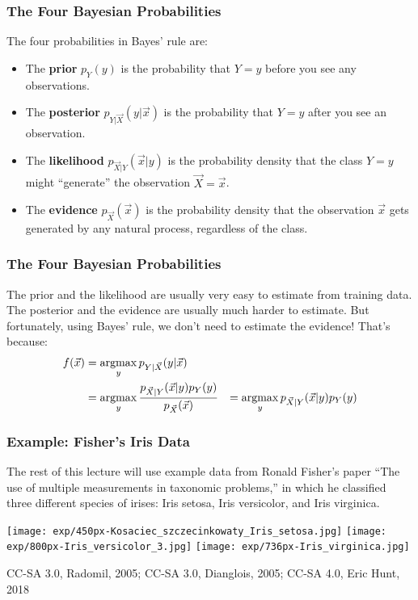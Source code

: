 \documentclass{beamer}
\newcommand{\argmax}{\operatornamewithlimits{argmax}}
\begin{document}
\begin{frame}
  \frametitle{The Four Bayesian Probabilities}

  The four probabilities in Bayes' rule are:
  \begin{itemize}
  \item
    The {\bf prior} $p_Y(y)$ is the probability that $Y=y$ before you
    see any observations.
  \item
    The {\bf posterior} $p_{Y|\vec{X}}(y|\vec{x})$ is the probability
    that $Y=y$ after you see an observation.
  \item
    The {\bf likelihood} $p_{\vec{X}|Y}(\vec{x}|y)$ is the probability
    density that the class $Y=y$ might ``generate'' the observation
    $\vec{X}=\vec{x}$.  
  \item
    The {\bf evidence} $p_{\vec{X}}(\vec{x})$ is the probability
    density that the observation $\vec{x}$ gets generated by any
    natural process, regardless of the class.
  \end{itemize}
\end{frame}

\begin{frame}
  \frametitle{The Four Bayesian Probabilities}

  The prior and the likelihood are usually very easy to estimate from
  training data.  The posterior and the evidence are usually much
  harder to estimate.  But fortunately, using Bayes' rule, we don't
  need to estimate the evidence!  That's because:
  \begin{align*}
    f(\vec{x}) &= \argmax_y p_{Y|\vec{X}}(y|\vec{x})\\
    &= \argmax_y \frac{p_{\vec{X}|Y}(\vec{x}|y)p_Y(y)}{p_{\vec{X}}(\vec{x})}
    &= \argmax_y p_{\vec{X}|Y}(\vec{x}|y)p_Y(y)
  \end{align*}
\end{frame}

\begin{frame}
  \frametitle{Example: Fisher's Iris Data}

  The rest of this lecture will use example data from Ronald Fisher's
  paper ``The use of multiple measurements in taxonomic problems,'' in
  which he classified three different species of irises: Iris setosa,
  Iris versicolor, and Iris virginica.

  \centerline{\texttt{[image: exp/450px-Kosaciec\_szczecinkowaty\_Iris\_setosa.jpg]}
    \texttt{[image: exp/800px-Iris\_versicolor\_3.jpg]}
    \texttt{[image: exp/736px-Iris\_virginica.jpg]}}

  {\tiny CC-SA 3.0, Radomil, 2005; CC-SA 3.0, Dianglois, 2005; CC-SA 4.0, Eric Hunt, 2018}
\end{frame}
\end{document}
